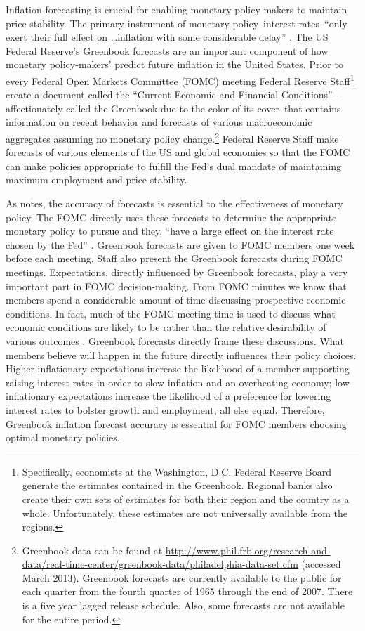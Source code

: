 \documentclass[a4paper]{article}
\begin{document}
Inflation forecasting is crucial for enabling monetary policy-makers to maintain price stability. The primary instrument of monetary policy--interest rates--``only exert their full effect on \ldots inflation with some considerable delay'' \citep[59]{Goodhart2001}. The US Federal Reserve's Greenbook forecasts are an important component of how monetary policy-makers' predict future inflation in the United States. Prior to every Federal Open Markets Committee (FOMC) meeting Federal Reserve Staff\footnote{Specifically, economists at the Washington, D.C. Federal Reserve Board generate the estimates contained in the Greenbook. Regional banks also create their own sets of estimates for both their region and the country as a whole. Unfortunately, these estimates are not universally available from the regions.} create a document called the ``Current Economic and Financial Conditions''--affectionately called the Greenbook due to the color of its cover--that contains information on recent behavior and forecasts of various macroeconomic aggregates assuming no monetary policy change.\footnote{Greenbook data can be found at {\url{http://www.phil.frb.org/research-and-data/real-time-center/greenbook-data/philadelphia-data-set.cfm}} (accessed March 2013). Greenbook forecasts are currently available to the public for each quarter from the fourth quarter of 1965 through the end of 2007. There is a five year lagged release schedule. Also, some forecasts are not available for the entire period.} Federal Reserve Staff make forecasts of various elements of the US and global economies so that the FOMC can make policies appropriate to fulfill the Fed's dual mandate of maintaining maximum employment and price stability.

As \cite{Svensson2005} notes, the accuracy of forecasts is essential to the effectiveness of monetary policy. The FOMC directly uses these forecasts to determine the appropriate monetary policy to pursue and they, ``have a large effect on the interest rate chosen by the Fed'' \citep[130]{Adolph2013}. Greenbook forecasts are given to FOMC members one week before each meeting. Staff also present the Greenbook forecasts during FOMC meetings. Expectations, directly influenced by Greenbook forecasts, play a very important part in FOMC decision-making. From FOMC minutes we know that members spend a considerable amount of time discussing prospective economic conditions. In fact, much of the FOMC meeting time is used to discuss what economic conditions are likely to be rather than the relative desirability of various outcomes \citep[230]{RomerRomer2008}. Greenbook forecasts directly frame these discussions. What members believe will happen in the future directly influences their policy choices. Higher inflationary expectations increase the likelihood of a member supporting raising interest rates in order to slow inflation and an overheating economy; low inflationary expectations increase the likelihood of a preference for lowering interest rates to bolster growth and employment, all else equal. Therefore, Greenbook inflation forecast accuracy is essential for FOMC members choosing optimal monetary policies.
\end{document}

